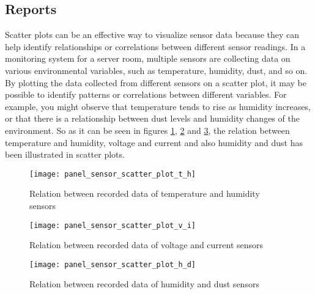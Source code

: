     \subsection{Reports}
    Scatter plots can be an effective way to visualize sensor data because they can help identify relationships or correlations between different sensor readings. In a monitoring system for a server room, multiple sensors are collecting data on various environmental variables, such as temperature, humidity, dust, and so on. By plotting the data collected from different sensors on a scatter plot, it may be possible to identify patterns or correlations between different variables. For example, you might observe that temperature tends to rise as humidity increases, or that there is a relationship between dust levels and humidity changes of the environment. So as it can be seen in figures \ref{panel_sensor_scatter_plot_t_h}, \ref{panel_sensor_scatter_plot_v_i} and \ref{panel_sensor_scatter_plot_h_d}, the relation between temperature and humidity, voltage and current and also humidity and dust has been illustrated in scatter plots. 
    \begin{figure}
        \centering
        \texttt{[image: panel\_sensor\_scatter\_plot\_t\_h]}
        \caption{Relation between recorded data of temperature and humidity sensors}
        \label{panel_sensor_scatter_plot_t_h}
    \end{figure}
    \begin{figure}
        \centering
        \texttt{[image: panel\_sensor\_scatter\_plot\_v\_i]}
        \caption{Relation between recorded data of voltage and current sensors}
        \label{panel_sensor_scatter_plot_v_i}
    \end{figure}
    \begin{figure}
        \centering
        \texttt{[image: panel\_sensor\_scatter\_plot\_h\_d]}
        \caption{Relation between recorded data of humidity and dust sensors}
        \label{panel_sensor_scatter_plot_h_d}
    \end{figure}

